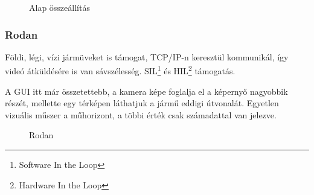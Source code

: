 \documentclass[12pt]{article}
\begin{document}
\begin{itemize}
\begin{figure}[H]
	\centering
	\caption{Alap összeállítás}
	\label{fig:mit}
\end{figure}

\subsubsection{Rodan}
\cite{bib:rodan}Földi, légi, vízi jármüveket is támogat, TCP/IP-n keresztül kommunikál, így videó átküldésére is van sávszélesség. SIL\footnote{Software In the Loop} és HIL\footnote{Hardware In the Loop} támogatás.

A GUI itt már összetettebb, a kamera képe foglalja el a képerny\H{o} nagyobbik részét, mellette egy térképen láthatjuk a járm\H{u} eddigi útvonalát. Egyetlen vizuális m\H{u}szer a m\H{u}horizont, a többi érték csak számadattal van jelezve.

\begin{figure}[H]
	\centering
	\caption{Rodan}
	\label{fig:rodan}
\end{figure}


\end{itemize}
\end{document}
